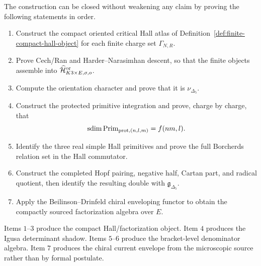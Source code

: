 The construction can be closed without weakening any claim by proving
the following statements in order.

\begin{enumerate}
\item Construct the compact oriented critical Hall atlas of
  Definition~\ref{def:finite-compact-hall-object} for each finite
  charge set \(\Gamma_{N,R}\).
\item Prove Cech/Ran and Harder--Narasimhan descent, so that the finite
  objects assemble into
  \(\widehat{\mathcal H}^{\mathrm{or}}_{K3\times E,\sigma,o}\).
\item Compute the orientation character and prove that it is
  \(\nu_{\Delta_5}\).
\item Construct the protected primitive integration and prove, charge by
  charge, that
  \[
    \operatorname{sdim}\operatorname{Prim}_{\mathrm{prot},(n,l,m)}=f(nm,l).
  \]
\item Identify the three real simple Hall primitives and prove the full
  Borcherds relation set in the Hall commutator.
\item Construct the completed Hopf pairing, negative half, Cartan part,
  and radical quotient, then identify the resulting double with
  \(\mathfrak g_{\Delta_5}\).
\item Apply the Beilinson--Drinfeld chiral enveloping functor to obtain
  the compactly sourced factorization algebra over \(E\).
\end{enumerate}

Items \(1\)--\(3\) produce the compact Hall/factorization object.  Item
\(4\) produces the Igusa determinant shadow.  Items \(5\)--\(6\) produce
the bracket-level denominator algebra.  Item \(7\) produces the chiral
current envelope from the microscopic source rather than by formal
postulate.
